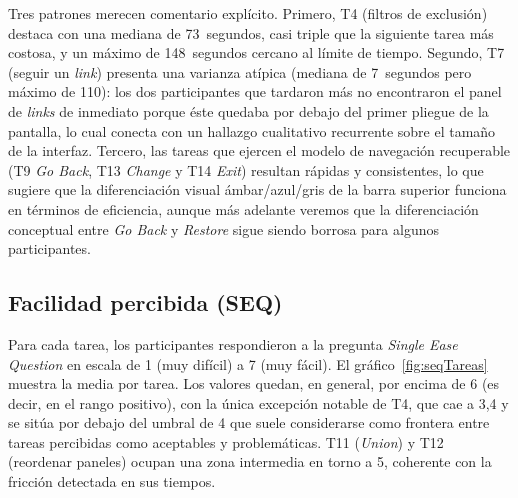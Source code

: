 Tres patrones merecen comentario explícito. Primero, T4 (filtros de exclusión) destaca con
una mediana de 73~segundos, casi triple que la siguiente tarea más costosa, y un máximo de
148~segundos cercano al límite de tiempo. Segundo, T7 (seguir un \textit{link}) presenta
una varianza atípica (mediana de 7~segundos pero máximo de 110): los dos participantes que
tardaron más no encontraron el panel de \textit{links} de inmediato porque éste quedaba por
debajo del primer pliegue de la pantalla, lo cual conecta con un hallazgo cualitativo
recurrente sobre el tamaño de la interfaz. Tercero, las tareas que ejercen el modelo de
navegación recuperable (T9 \textit{Go Back}, T13 \textit{Change} y T14 \textit{Exit})
resultan rápidas y consistentes, lo que sugiere que la diferenciación visual ámbar/azul/gris
de la barra superior funciona en términos de eficiencia, aunque más adelante veremos que la
diferenciación conceptual entre \textit{Go Back} y \textit{Restore} sigue siendo borrosa
para algunos participantes.

\subsection{Facilidad percibida (SEQ)}

Para cada tarea, los participantes respondieron a la pregunta \textit{Single Ease Question}
en escala de 1 (muy difícil) a 7 (muy fácil). El gráfico~\ref{fig:seqTareas} muestra la
media por tarea. Los valores quedan, en general, por encima de 6 (es decir, en el rango
positivo), con la única excepción notable de T4, que cae a 3{,}4 y se sitúa por debajo del
umbral de 4 que suele considerarse como frontera entre tareas percibidas como aceptables y
problemáticas. T11 (\textit{Union}) y T12 (reordenar paneles) ocupan una zona intermedia
en torno a 5, coherente con la fricción detectada en sus tiempos.

